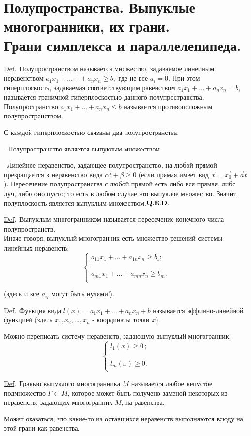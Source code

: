 \documentclass[a4paper]{article}%
\renewcommand{\de}{\par\noindent\underline{Def}.\ }%
\renewcommand{\ab}{\par\noindent}%
\newcommand{\dok}{\par\noindent{\textsl{Доказательство}.}\ }%
\newcommand{\qed}{\quad${{\bf Q.E.D.}}$}
\renewcommand{\nn}[1]{#1_1,#1_2,\dots,#1_n}%
\newcommand{\oi}[1]{\overrightarrow{#1}}%
\renewcommand{\le}{\leqslant}
\renewcommand{\ge}{\geqslant}
\begin{document}
\section{Полупространства. Выпуклые многогранники, их грани.\\ Грани симплекса и параллелепипеда.}
\label{q40}%
\de Полупространством называется множество, задаваемое линейным неравенством $a_1x_1+\dots++\,a_nx_n\ge b,$ где не
все $a_i=0.$ При этом гиперплоскость, задаваемая соответствующим равенством $a_1x_1+\dots+a_nx_n=b$, называется
граничной гиперплоскостью данного полупространства. Полупространство $a_1x_1+\dots+a_nx_n\le b$ называется
противоположным полупространством. %
\ab С каждой гиперплоскостью связаны два полупространства.%
\ab{\bf Утверждение}. Полупространство является выпуклым множеством.%
\dok Линейное неравенство, задающее полупространство, на любой прямой превращается в неравенство вида $\alpha
t+\beta\ge 0$ (если прямая имеет вид $\oi{x}=\oi{x_0}+\oi{a}t$). Пересечение полупространства с любой прямой есть
либо вся прямая, либо луч, либо оно пусто; то есть в любом случае это выпуклое множество. Значит, полуплоскость
является выпуклым множеством.\qed %
\de Выпуклым многогранником называется пересечение конечного числа полупространств.\\ Иначе говоря, выпуклый
многогранник есть множество решений системы линейных неравенств:
$$\left\{%
\begin{array}{ll}
    a_{11}x_1+\dots+a_{1n}x_n\ge b_1;\\
    \vdots\\
    a_{m1}x_1+\dots+a_{mn}x_n\ge b_m.\\
\end{array}%
\right.$$
\ab(здесь и все $a_{ij}$ могут быть нулями!).
\de Функция вида $l(x)=a_1x_1+\dots+a_nx_n+b$ называется аффинно-линейной функцией (здесь $\nn{x}$ - координаты точки $x$).
\ab Можно переписать систему неравенств, задающую выпуклый многогранник:
$$\left\{%
\begin{array}{ll}
    l_1(x)\ge 0\,;\\
    \vdots\\
    l_m(x)\ge 0.\\
\end{array}%
\right.
$$
\de Гранью выпуклого многогранника $M$ называется любое непустое подмножество $\Gamma\subset M$, которое может быть получено
заменой некоторых из неравенств, задающих многогранник $M$, на равенства.
\ab{\bf !} Может оказаться, что какие-то из оставшихся неравенств выполняются всюду на этой грани как равенства.
\end{document}
